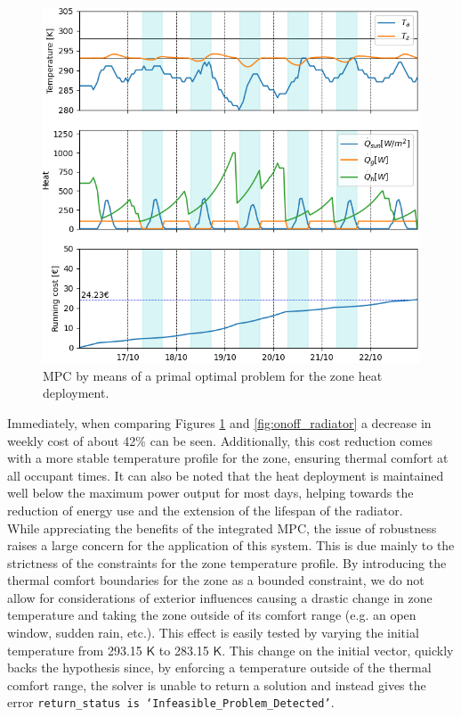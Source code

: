 \begin{figure}[H]
\centering
\includegraphics[scale=0.8]{images/mpc_primal.png}
\caption{MPC by means of a primal optimal problem for the zone heat deployment.}
\label{fig:mpc_primal}
\end{figure}

Immediately, when comparing Figures \ref{fig:mpc_primal} and \ref{fig:onoff_radiator} a decrease in weekly cost of about 42\% can be seen. Additionally, this cost reduction comes with a more stable temperature profile for the zone, ensuring thermal comfort at all occupant times. It can also be noted that the heat deployment is maintained well below the maximum power output for most days, helping towards the reduction of energy use and the extension of the lifespan of the radiator.\\

While appreciating the benefits of the integrated MPC, the issue of robustness raises a large concern for the application of this system. This is due mainly to the strictness of the constraints for the zone temperature profile. By introducing the thermal comfort boundaries for the zone as a bounded constraint, we do not allow for considerations of exterior influences causing a drastic change in zone temperature and taking the zone outside of its comfort range (e.g. an open window, sudden rain, etc.). This effect is easily tested by varying the initial temperature from 293.15 $\mathsf{K}$ to 283.15 $\mathsf{K}$. This change on the initial vector, quickly backs the hypothesis since, by enforcing a temperature outside of the thermal comfort range, the solver is unable to return a solution and instead gives the error \texttt{return\_status is `Infeasible\_Problem\_Detected'}.\\

